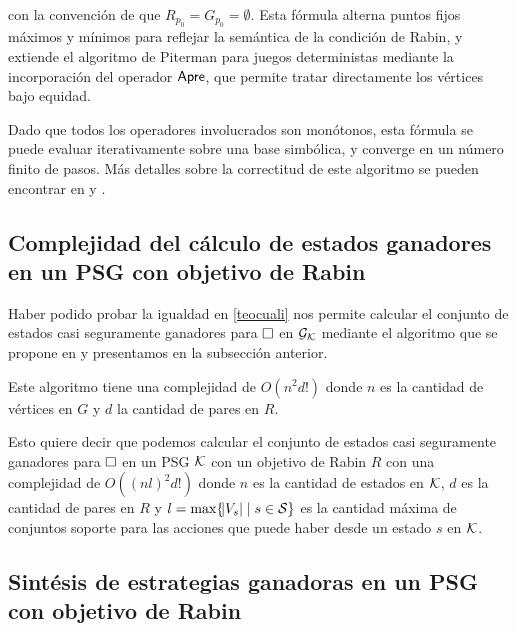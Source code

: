 con la convención de que \( R_{p_0} = G_{p_0} = \emptyset \). Esta fórmula
alterna puntos fijos máximos y mínimos para reflejar la semántica de la
condición de Rabin, y extiende el algoritmo de Piterman para juegos
deterministas mediante la incorporación del operador \( \textsf{Apre} \), que permite
tratar directamente los vértices bajo equidad.

Dado que todos los operadores involucrados son monótonos, esta fórmula se puede
evaluar iterativamente sobre una base simbólica, y converge en un número finito
de pasos. Más detalles sobre la correctitud de este algoritmo se pueden
encontrar en \cite{Banerjee} y \cite{Piterman}.


\subsection*{Complejidad del cálculo de estados ganadores en un PSG con objetivo de Rabin}

Haber podido probar la igualdad en \ref{teocuali} nos permite calcular el
conjunto de estados casi seguramente ganadores para $\square$ en $\mathcal{G}_{\mathcal{K}}$ mediante
el algoritmo que se propone en \cite{Banerjee} y presentamos en la subsección
anterior.

Este algoritmo tiene una complejidad de $O(n^2 d!)$ donde $n$ es la cantidad de
vértices en $G$ y $d$ la cantidad de pares en $R$.

Esto quiere decir que podemos calcular el conjunto de estados casi seguramente
ganadores para $\square$ en un PSG $\mathcal{K}$ con un objetivo de Rabin $R$ con una
complejidad de $O((n l)^2 d! )$ donde $n$ es la cantidad de estados en $\mathcal{K}$,
$d$ es la cantidad de pares en $R$ y $l = \max \{\abs{V_s} \mid s \in \mathcal{S} \}$
es la cantidad máxima de conjuntos soporte para las acciones que puede haber
desde un estado $s$ en $\mathcal{K}$.

\subsection*{Sintésis de estrategias ganadoras en un PSG con objetivo de Rabin}

